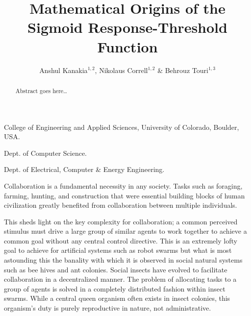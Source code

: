 \documentclass{nature}
\title{Mathematical Origins of the Sigmoid Response-Threshold Function}
\author{Anshul Kanakia$^{1,2}$, Nikolaus Correll$^{1,2}$ \& Behrouz Touri$^{1,3}$}
\begin{document}
\maketitle

\begin{affiliations}
 \item College of Engineering and Applied Sciences, University of Colorado, Boulder, USA. 
 \item Dept. of Computer Science.
 \item Dept. of Electrical, Computer \& Energy Engineering.
\end{affiliations}

\begin{abstract}
Abstract goes here\ldots
\end{abstract}

Collaboration is a fundamental necessity in any society. Tasks such as foraging, farming, hunting, and construction that were essential building blocks of human civilization greatly benefited from collaboration between multiple individuals. 

This sheds light on the key complexity for collaboration; a common perceived stimulus must drive a large group of similar agents to work together to achieve a common goal without any central control directive. This is an extremely lofty goal to achieve for artificial systems such as robot swarms but what is most astounding this the banality with which it is observed in social natural systems such as bee hives and ant colonies. Social insects have evolved to facilitate collaboration in a decentralized manner. The problem of allocating tasks to a group of agents is solved in a completely distributed fashion within insect swarms. While a central queen organism often exists in insect colonies, this organism's duty is purely reproductive in nature, not administrative.
\end{document}
